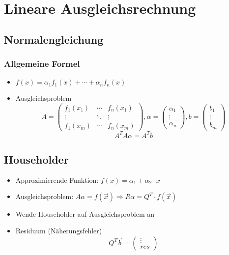 \section{Lineare Ausgleichsrechnung}

\subsection{Normalengleichung}
\subsubsection*{Allgemeine Formel}
\begin{itemize}

	\item $f(x) = \alpha_1f_1(x) + \cdots + \alpha_nf_n(x)$
	
	\item Ausgleichsproblem
	\begin{displaymath}
		A = 
		\begin{pmatrix}
			f_1(x_1) & \cdots & f_n(x_1) \\
			\vdots & \ddots & \vdots \\
			f_1(x_m) & \cdots & f_n(x_m)
		\end{pmatrix}
		, \alpha =
		\begin{pmatrix}
			\alpha_1 \\ \vdots \\ \alpha_n
		\end{pmatrix}
		, b = 
		\begin{pmatrix}
			b_1 \\ \vdots \\ b_m
		\end{pmatrix}
	\end{displaymath}
	\begin{equation*}
		A^TA\alpha = A^Tb
	\end{equation*}

\end{itemize}

\subsection{Householder}
\begin{itemize}
	
	\item Approximierende Funktion: $f(x) = \alpha_1 + \alpha_2 \cdot x$
	
	\item Ausgleichsproblem: $A\alpha = f(\vec{x}) \Rightarrow R\alpha = Q^T \cdot f(\vec{x})$
	
	\item Wende Householder auf Ausgleichsproblem an
	
	\item Residuum (Näherungsfehler)
	\begin{displaymath}
		Q^T\vec{b} = 
		\begin{pmatrix}
			\vdots \\
			res
		\end{pmatrix}
	\end{displaymath}

\end{itemize}